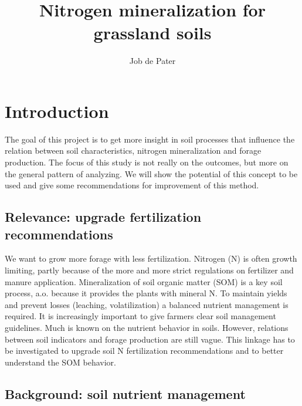 \documentclass[10pt,twoside,dutch,english]{report}
\author{Job de Pater}
\title{Nitrogen mineralization for grassland soils } %
\begin{document}
\setcounter{tocdepth}{1}
\linespread{1.0}
\tableofcontents
\linespread{1.3}
\thispagestyle{empty}
\pagebreak
{}



\chapter{Introduction}
The goal of this project is to get more insight in soil processes that influence the relation between soil characteristics, nitrogen mineralization and forage production. The focus of this study is not really on the outcomes, but more on the general pattern of analyzing. We will show the potential of this concept to be used and give some recommendations for improvement of this method. 

\section{Relevance: upgrade fertilization recommendations}
	We want to grow more forage with less fertilization. Nitrogen (N) is often growth limiting, partly because of the more and more strict regulations on fertilizer and manure application. Mineralization of soil organic matter (SOM) is a key soil process, a.o. because it provides the plants with mineral N. To maintain yields and prevent losses (leaching, volatilization) a balanced nutrient management is required. It is increasingly important to give farmers clear soil management guidelines. Much is known on the nutrient behavior in soils. However, relations between soil indicators and forage production are still vague.  This linkage has to be investigated to upgrade soil N fertilization recommendations and to better understand the SOM behavior. 
	
\section{Background: soil nutrient management}
	
			
\end{document}
